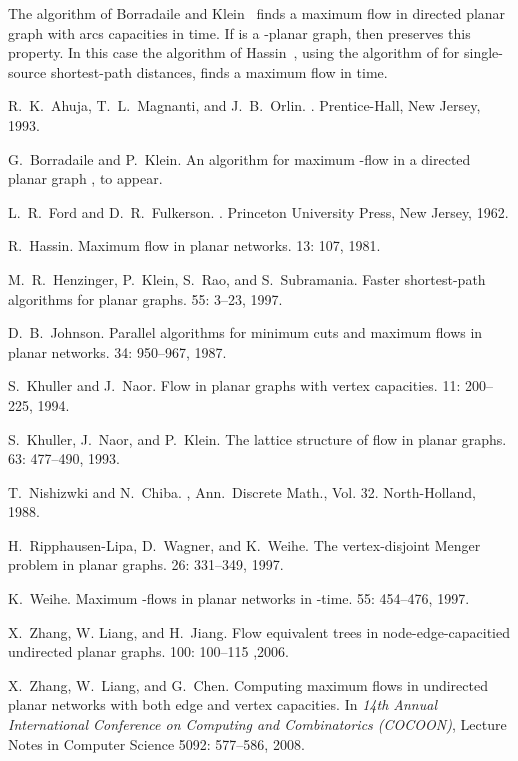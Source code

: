 \documentclass[a4paper,11pt]{article}
\begin{document}
The algorithm of Borradaile and Klein~\cite{BK} finds a maximum flow
in directed planar graph with arcs capacities in  time. If
 is a -planar graph, then  preserves this property. In
this case the algorithm of Hassin~\cite{H81}, using the algorithm of
\cite{HKRS97} for single-source shortest-path distances, finds a
maximum flow in  time.

\begin{thebibliography}{10}
R.~K.~Ahuja, T.~L.~Magnanti, and J.~B.~Orlin.
.
\newblock Prentice-Hall, New Jersey, 1993.

G.~Borradaile and P.~Klein.
\newblock An  algorithm for maximum -flow in a directed planar graph
, to appear.

L.~R.~Ford and D.~R.~Fulkerson.
.
\newblock Princeton University Press, New Jersey, 1962.

R.~Hassin.
\newblock Maximum flow in  planar networks.
 13: 107, 1981.

M.~R.~Henzinger, P.~Klein, S.~Rao, and S.~Subramania.
\newblock Faster shortest-path algorithms for planar graphs.
 55: 3--23, 1997.

D.~B.~Johnson.
\newblock Parallel algorithms for minimum cuts and maximum flows in planar networks.
 34: 950--967, 1987.

S.~Khuller and J.~Naor.
\newblock Flow in planar graphs with vertex capacities.
 11: 200--225, 1994.

S.~Khuller, J.~Naor, and P.~Klein.
\newblock The lattice structure of flow in planar graphs.
 63: 477--490, 1993.

T.~Nishizwki and N.~Chiba.
, Ann.\ Discrete Math., Vol. 32.
\newblock North-Holland, 1988.

H.~Ripphausen-Lipa, D.~Wagner, and K.~Weihe.
\newblock The vertex-disjoint Menger problem in planar graphs.
 26: 331--349, 1997.

K.~Weihe.
\newblock Maximum -flows in planar networks in -time.
 55: 454--476, 1997.

X.~Zhang, W. Liang, and H.~Jiang.
\newblock Flow equivalent trees in node-edge-capacitied undirected planar graphs.
 100: 100--115 ,2006.

X.~Zhang, W.~Liang, and G.~Chen.
\newblock Computing maximum flows in undirected planar networks with both edge and vertex capacities.
\newblock In {\em 14th Annual International Conference on Computing and Combinatorics (COCOON)},
Lecture Notes in Computer Science 5092: 577--586, 2008.

\end{thebibliography}
\end{document}
